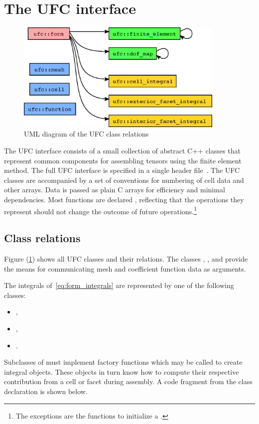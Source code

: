 \section{The UFC interface}
\label{sec:ufc:syntax}

\begin{figure}
  \begin{center}
    \includegraphics[width=10cm]{chapters/alnes-2/eps/ufc_classes.eps}
    \caption{UML diagram of the UFC class relations}
    \label{fig:uml}
  \end{center}
\end{figure}

The UFC interface consists of a small collection of abstract C++
classes that represent common components for assembling tensors using
the finite element method. The full UFC interface is specified in a
single header file~. The UFC classes are accompanied by a
set of conventions for numbering of cell data and other arrays. Data
is passed as plain C arrays for efficiency and minimal dependencies.
Most functions are declared , reflecting that the
operations they represent should not change the outcome of future
operations.\footnote{The exceptions are the functions to initialize a
  .}

\subsection{Class relations}

Figure (\ref{fig:uml}) shows all UFC classes and their relations. The
classes , , and  provide the means
for communicating mesh and coefficient function data as
arguments.

The integrals of~\eqref{eq:form_integrals} are represented by one of
the following classes:
\begin{itemize}
\item
  ,
\item
  ,
\item
  .
\end{itemize}
Subclasses of  must implement factory functions which may be
called to create integral objects. These objects in turn know how to
compute their respective contribution from a cell or facet during
assembly. A code fragment from the  class declaration is
shown below.

